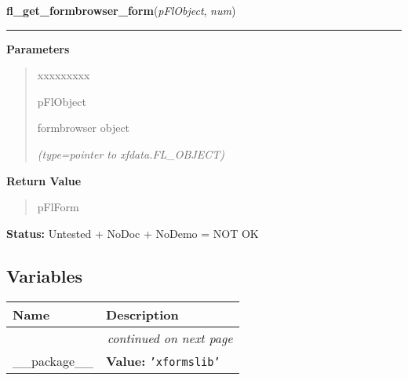 \hspace{.8\funcindent}\begin{boxedminipage}{\funcwidth}

    \raggedright \textbf{fl\_get\_formbrowser\_form}(\textit{pFlObject}, \textit{num})

    \vspace{-1.5ex}

    \rule{\textwidth}{0.5\fboxrule}
\setlength{\parskip}{2ex}
\setlength{\parskip}{1ex}
      \textbf{Parameters}
      \vspace{-1ex}

      \begin{quote}
        \begin{Ventry}{xxxxxxxxx}

          \item[pFlObject]

          formbrowser object

            {\it (type=pointer to xfdata.FL\_OBJECT)}

        \end{Ventry}

      \end{quote}

      \textbf{Return Value}
    \vspace{-1ex}

      \begin{quote}
      pFlForm

      \end{quote}

\textbf{Status:} Untested + NoDoc + NoDemo = NOT OK



    \end{boxedminipage}



  \subsection{Variables}

    \vspace{-1cm}
\hspace{\varindent}\begin{longtable}{|p{\varnamewidth}|p{\vardescrwidth}|l}
\cline{1-2}
\cline{1-2} \centering \textbf{Name} & \centering \textbf{Description}& \\
\cline{1-2}
\endhead\cline{1-2}\multicolumn{3}{r}{\small\textit{continued on next page}}\\\endfoot\cline{1-2}
\endlastfoot\raggedright \_\-\_\-p\-a\-c\-k\-a\-g\-e\-\_\-\_\- & \raggedright \textbf{Value:} 
{\tt \texttt{'}\texttt{xformslib}\texttt{'}}&\\
\cline{1-2}
\end{longtable}

